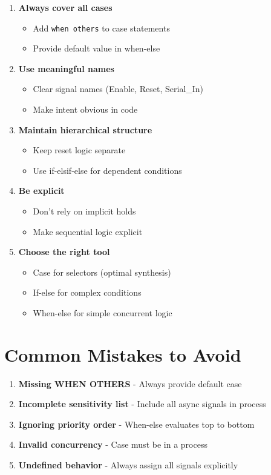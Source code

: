 \documentclass[12pt,a4paper]{article}
\begin{document}
\begin{enumerate}
    \item \textbf{Always cover all cases}
    \begin{itemize}
        \item Add \texttt{when others} to case statements
        \item Provide default value in when-else
    \end{itemize}
    
    \item \textbf{Use meaningful names}
    \begin{itemize}
        \item Clear signal names (Enable, Reset, Serial\_In)
        \item Make intent obvious in code
    \end{itemize}
    
    \item \textbf{Maintain hierarchical structure}
    \begin{itemize}
        \item Keep reset logic separate
        \item Use if-elsif-else for dependent conditions
    \end{itemize}
    
    \item \textbf{Be explicit}
    \begin{itemize}
        \item Don't rely on implicit holds
        \item Make sequential logic explicit
    \end{itemize}
    
    \item \textbf{Choose the right tool}
    \begin{itemize}
        \item Case for selectors (optimal synthesis)
        \item If-else for complex conditions
        \item When-else for simple concurrent logic
    \end{itemize}
\end{enumerate}

\section{Common Mistakes to Avoid}

\begin{enumerate}
    \item \textbf{Missing WHEN OTHERS} - Always provide default case
    \item \textbf{Incomplete sensitivity list} - Include all async signals in process
    \item \textbf{Ignoring priority order} - When-else evaluates top to bottom
    \item \textbf{Invalid concurrency} - Case must be in a process
    \item \textbf{Undefined behavior} - Always assign all signals explicitly
\end{enumerate}
\end{document}
